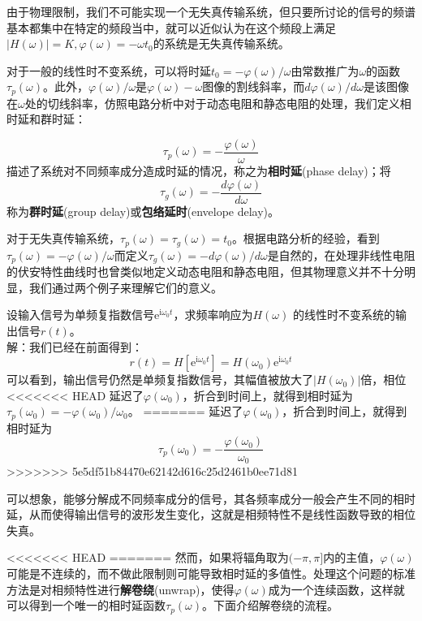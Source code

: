 由于物理限制，我们不可能实现一个无失真传输系统，但只要所讨论的信号的频谱基本都集中在特定的频段当中，就可以近似认为在这个频段上满足$|H(\omega)|=K,\varphi(\omega)=-\omega t_0$的系统是无失真传输系统。

对于一般的线性时不变系统，可以将时延$t_0=-\varphi(\omega)/\omega$由常数推广为$\omega$的函数$\tau_p(\omega)$。此外，$\varphi(\omega)/\omega$是$\varphi(\omega)-\omega$图像的割线斜率，而$d\varphi(\omega)/d\omega$是该图像在$\omega$处的切线斜率，仿照电路分析中对于动态电阻和静态电阻的处理，我们定义相时延和群时延\cite{signal_systems}：
\begin{definition}[相时延和群时延]
\[\tau_p(\omega)=-\frac{\varphi(\omega)}{\omega}\]
描述了系统对不同频率成分造成时延的情况，称之为\textbf{相时延}(phase delay)；将
\[\tau_g(\omega)=-\frac{d\varphi(\omega)}{d\omega}\]
称为\textbf{群时延}(group delay)或\textbf{包络延时}(envelope delay)。
\end{definition}

对于无失真传输系统，$\tau_p(\omega)=\tau_g(\omega)=t_0$。根据电路分析的经验，看到$\tau_p(\omega)=-\varphi(\omega)/\omega$而定义$\tau_g(\omega)=-d\varphi(\omega)/d\omega$是自然的，在处理非线性电阻的伏安特性曲线时也曾类似地定义动态电阻和静态电阻，但其物理意义并不十分明显，我们通过两个例子来理解它们的意义。

\begin{example}[相时延]
设输入信号为单频复指数信号$\mathrm{e}^{\mathrm{i}\omega_0 t}$，求频率响应为$H(\omega)$
的线性时不变系统的输出信号$r(t)$。\\
解：我们已经在前面得到：\[r(t)=H\left[\mathrm{e}^{\mathrm{i}\omega_0 t}\right]=H(\omega_0)\mathrm{e}^{\mathrm{i}\omega_0 t}\]
可以看到，输出信号仍然是单频复指数信号，其幅值被放大了$|H(\omega_0)|$倍，相位
<<<<<<< HEAD
延迟了$\varphi(\omega_0)$，折合到时间上，就得到相时延为$\tau_p(\omega_0)=-\varphi(\omega_0)/\omega_0$。
=======
延迟了$\varphi(\omega_0)$，折合到时间上，就得到相时延为
$$\tau_p(\omega_0)=-\frac{\varphi(\omega_0)}{\omega_0}$$
>>>>>>> 5e5df51b84470e62142d616c25d2461b0ee71d81
\end{example}

可以想象，能够分解成不同频率成分的信号，其各频率成分一般会产生不同的相时延，从而使得输出信号的波形发生变化，这就是相频特性不是线性函数导致的相位失真。

<<<<<<< HEAD
=======
然而，如果将辐角取为$(-\pi,\pi]$内的主值，$\varphi(\omega)$可能是不连续的，而不做此限制则可能导致相时延的多值性。处理这个问题的标准方法是对相频特性进行\textbf{解卷绕}(unwrap)，使得$\varphi(\omega)$成为一个连续函数，这样就可以得到一个唯一的相时延函数$\tau_p(\omega)$。下面介绍解卷绕的流程。

